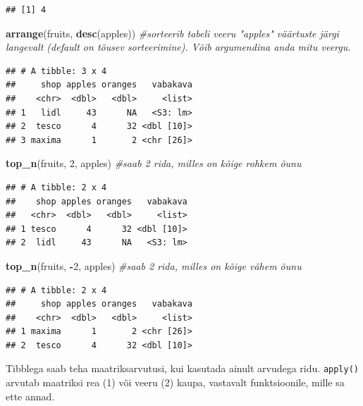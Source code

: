 \documentclass[]{book}
\newenvironment{Shaded}{\begin{snugshade}}{\end{snugshade}}
\newcommand{\KeywordTok}[1]{\textcolor[rgb]{0.13,0.29,0.53}{\textbf{#1}}}
\newcommand{\DecValTok}[1]{\textcolor[rgb]{0.00,0.00,0.81}{#1}}
\newcommand{\CommentTok}[1]{\textcolor[rgb]{0.56,0.35,0.01}{\textit{#1}}}
\newcommand{\OperatorTok}[1]{\textcolor[rgb]{0.81,0.36,0.00}{\textbf{#1}}}
\newcommand{\NormalTok}[1]{#1}
\begin{document}
\begin{verbatim}
## [1] 4
\end{verbatim}

\begin{Shaded}
\begin{Highlighting}[]
\KeywordTok{arrange}\NormalTok{(fruits, }\KeywordTok{desc}\NormalTok{(apples)) }\CommentTok{#sorteerib tabeli veeru "apples" väärtuste järgi langevalt (default on tõusev sorteerimine). Võib argumendina anda mitu veergu.}
\end{Highlighting}
\end{Shaded}

\begin{verbatim}
## # A tibble: 3 x 4
##     shop apples oranges   vabakava
##    <chr>  <dbl>   <dbl>     <list>
## 1   lidl     43      NA   <S3: lm>
## 2  tesco      4      32 <dbl [10]>
## 3 maxima      1       2 <chr [26]>
\end{verbatim}

\begin{Shaded}
\begin{Highlighting}[]
\KeywordTok{top_n}\NormalTok{(fruits, }\DecValTok{2}\NormalTok{, apples) }\CommentTok{#saab 2 rida, milles on kõige rohkem õunu}
\end{Highlighting}
\end{Shaded}

\begin{verbatim}
## # A tibble: 2 x 4
##    shop apples oranges   vabakava
##   <chr>  <dbl>   <dbl>     <list>
## 1 tesco      4      32 <dbl [10]>
## 2  lidl     43      NA   <S3: lm>
\end{verbatim}

\begin{Shaded}
\begin{Highlighting}[]
\KeywordTok{top_n}\NormalTok{(fruits, }\OperatorTok{-}\DecValTok{2}\NormalTok{, apples) }\CommentTok{#saab 2 rida, milles on kõige vähem õunu}
\end{Highlighting}
\end{Shaded}

\begin{verbatim}
## # A tibble: 2 x 4
##     shop apples oranges   vabakava
##    <chr>  <dbl>   <dbl>     <list>
## 1 maxima      1       2 <chr [26]>
## 2  tesco      4      32 <dbl [10]>
\end{verbatim}

Tibblega saab teha maatriksarvutusi, kui kasutada ainult arvudega ridu.
\texttt{apply()} arvutab maatriksi rea (1) või veeru (2) kaupa,
vastavalt funktsioonile, mille sa ette annad.
\end{document}
